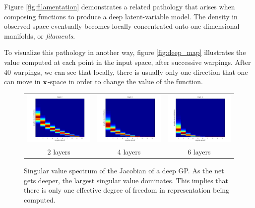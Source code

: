 \documentclass{article}
\begin{document}
Figure \ref{fig:filamentation} demonstrates a related pathology that arises when composing functions to produce a deep latent-variable model.  The density in observed space eventually becomes locally concentrated onto one-dimensional manifolds, or \emph{filaments}.

To visualize this pathology in another way, figure \ref{fig:deep_map} illustrates the value computed at each point in the input space, after successive warpings.  After 40 warpings, we can see that locally, there is usually only one direction that one can move in ${\bf{x}}$-space in order to change the value of the function.

\begin{figure}
\centering
\begin{tabular}{ccc}
\includegraphics[width=0.3\columnwidth]{figures/spectrum/svd_specturm_depth_2} &
\includegraphics[width=0.3\columnwidth]{figures/spectrum/svd_specturm_depth_4} &
\includegraphics[width=0.3\columnwidth]{figures/spectrum/svd_specturm_depth_6} \\
2 layers & 4 layers & 6 layers
\end{tabular}
\caption{Singular value spectrum of the Jacobian of a deep GP.  As the net gets deeper, the largest singular value dominates.  This implies that there is only one effective degree of freedom in representation being computed.}
\label{fig:deep_spectrum}
\end{figure}
\end{document}
